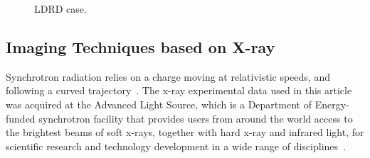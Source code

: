 \begin{figure}[!t]
\centering
{}
\hfil
{}
\caption{LDRD case.}
\label{fig:ldrd}
\end{figure}

\subsection{Imaging Techniques based on X-ray}


Synchrotron radiation relies on a charge moving at relativistic speeds, and following a curved trajectory~\cite{url:als:booklet}. The x-ray experimental data used in this article was acquired at the Advanced Light Source, which is a Department of Energy-funded synchrotron facility that provides users from around the world access to the brightest beams of soft x-rays, together with hard x-ray and infrared light, for scientific research and technology development in a wide range of disciplines~\cite{url:als}.

